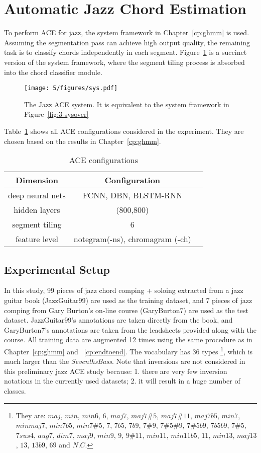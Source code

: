 \section{Automatic Jazz Chord Estimation} \label{sec:5-jazzace}
To perform ACE for jazz, the system framework in Chapter~\ref{cp:ghmm} is used. Assuming the segmentation pass can achieve high output quality, the remaining task is to classify chords independently in each segment. Figure~\ref{fig:5-jazzsys} is a succinct version of the system framework, where the segment tiling process is absorbed into the chord classifier module.
\begin{figure}[htb]
    \centering
        \texttt{[image: 5/figures/sys.pdf]}
    \caption{The Jazz ACE system. It is equivalent to the system framework in Figure~\ref{fig:3-sysover}}
    \label{fig:5-jazzsys}
\end{figure}

Table~\ref{tab:5-aceconfig} shows all ACE configurations considered in the experiment. They are chosen based on the results in Chapter~\ref{cp:ghmm}.
\begin{table}[htb]
\centering
\footnotesize
\begin{tabular}{|c|c|c|} \hline
Dimension & Configuration \\ \hline
deep neural nets & FCNN, DBN, BLSTM-RNN\\ \hline
hidden layers & (800,800)\\ \hline
segment tiling & 6\\ \hline
feature level & notegram(-ns), chromagram (-ch) \\ \hline
\end{tabular}
\caption{ACE configurations}
\label{tab:5-aceconfig}
\end{table}

\subsection{Experimental Setup}
In this study, 99 pieces of jazz chord comping + soloing extracted from a jazz guitar book \cite{jazzguitarbook} (JazzGuitar99) are used as the training dataset, and 7 pieces of jazz comping from Gary Burton's on-line course \cite{garyburtoncourse} (GaryBurton7) are used as the test dataset. JazzGuitar99's annotations are taken directly from the book, and GaryBurton7's annotations are taken from the leadsheets provided along with the course. All training data are augmented 12 times using the same procedure as in Chapter~\ref{cp:ghmm} and ~\ref{cp:endtoend}. The vocabulary has 36 types \footnote{They are: $maj$, $min$, $min6$, $6$, $maj7$, $maj7\#5$, $maj7\#11$, $maj7b5$, $min7$, $minmaj7$, $min7b5$, $min7\#5$, $7$, $7b5$, $7b9$, $7\#9$, $7\#5\#9$, $7\#5b9$, $7b5b9$, $7\#5$, $7sus4$, $aug7$, $dim7$, $ maj9$, $min9$, $9$, $9\#11$, $min11$, $min11b5$, $11$, $min13$, $maj13$, $13$, $13b9$, $69$ and $N.C.$}, which is much larger than the \textit{SeventhsBass}. Note that inversions are not considered in this preliminary jazz ACE study because: 1. there are very few inversion notations in the currently used datasets; 2. it will result in a huge number of classes.

